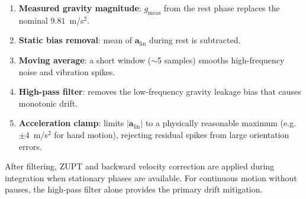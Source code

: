 \begin{enumerate}
  \item \textbf{Measured gravity magnitude}: $g_\text{meas}$ from the rest
        phase replaces the nominal $9.81$~m/s$^2$.
  \item \textbf{Static bias removal}: mean of
        $\mathbf{a}_\text{lin}$ during rest is subtracted.
  \item \textbf{Moving average}: a short window ($\sim$5 samples) smooths
        high-frequency noise and vibration spikes.
  \item \textbf{High-pass filter}: removes the low-frequency gravity leakage
        bias that causes monotonic drift.
  \item \textbf{Acceleration clamp}: limits $|\mathbf{a}_\text{lin}|$ to a
        physically reasonable maximum (e.g.\ $\pm 4$~m/s$^2$ for hand motion),
        rejecting residual spikes from large orientation errors.
\end{enumerate}

\noindent After filtering, ZUPT and backward velocity correction are applied
during integration when stationary phases are available. For continuous motion
without pauses, the high-pass filter alone provides the primary drift
mitigation.

%
